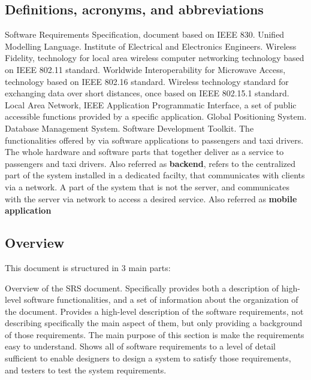 \subsection{Definitions, acronyms, and abbreviations}
\begin{itemize}
	 Software Requirements Specification, document based on IEEE 830.
	 Unified Modelling Language.
	 Institute of Electrical and Electronics Engineers.
	 Wireless Fidelity, technology for local area wireless computer networking technology based on IEEE 802.11 standard.
	 Worldwide Interoperability for Microwave Access, technology based on IEEE 802.16 standard.
	 Wireless technology standard for exchanging data over short distances, once based on IEEE 802.15.1 standard.
	 Local Area Network, IEEE
	 Application Programmatic Interface, a set of public accessible functions provided by a specific application.
	 Global Positioning System.
	 Database Management System.
	 Software Development Toolkit.
	 The functionalities offered by \myTaxiService{} via software applications to passengers and taxi drivers.
	 The whole hardware and software parts that together deliver \myTaxiService{} as a service to passengers and taxi drivers.
	 Also referred as \textbf{backend}, refers to the centralized part of the system installed in a dedicated facilty, that communicates with clients via a network.
	 A part of the system that is not the server, and communicates with the server via network to access a desired service.
	 Also referred as \textbf{mobile application}
\end{itemize}
\subsection{Overview}
This document is structured in 3 main parts:
\begin{itemize}
	 Overview of the SRS document. Specifically provides both a description of high-level software functionalities, and a set of information about the organization of the document.
	 Provides a high-level description of the software requirements, not describing specifically the main aspect of them, but only providing a background of those requirements. The main purpose of this section is make the requirements easy to understand.
	 Shows all of software requirements to a level of detail sufficient to enable designers to design a system to satisfy those requirements, and testers to test the system requirements.
\end{itemize}
